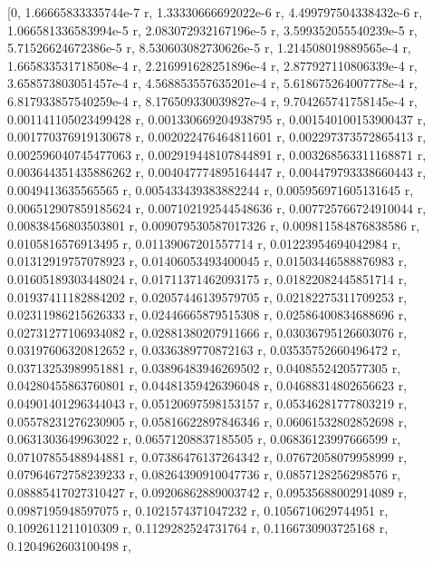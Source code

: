 \documentclass[12pt,arial,letterpaper]{book}
\begin{document}
\begin{eulernootebook}
\begin{eulercomment}
\begin{eulercomment}
\begin{eulernootebook}
\begin{eulercomment}
\begin{eulercomment}
\begin{eulercomment}
\begin{eulercomment}
\begin{eulercomment}
\begin{eulercomment}
\begin{eulernotebook}
\begin{eulercomment}
\begin{eulercomment}
\begin{eulercomment}
\begin{eulercomment}
\begin{eulercomment}
\begin{eulercomment}
\begin{eulercomment}
\begin{eulercomment}
\begin{eulercomment}
\begin{eulercomment}
\begin{eulercomment}
\begin{eulercomment}
\begin{eulercomment}
\begin{eulercomment}
\begin{eulercomment}
\begin{eulercomment}
\begin{euleroutput}
          [0, 1.66665833335744e-7 r, 1.33330666692022e-6 r, 
  4.499797504338432e-6 r, 1.066581336583994e-5 r, 
  2.083072932167196e-5 r, 3.599352055540239e-5 r, 
  5.71526624672386e-5 r, 8.530603082730626e-5 r, 
  1.214508019889565e-4 r, 1.665833531718508e-4 r, 
  2.216991628251896e-4 r, 2.877927110806339e-4 r, 
  3.658573803051457e-4 r, 4.568853557635201e-4 r, 
  5.618675264007778e-4 r, 6.817933857540259e-4 r, 
  8.176509330039827e-4 r, 9.704265741758145e-4 r, 
  0.001141105023499428 r, 0.001330669204938795 r, 
  0.001540100153900437 r, 0.001770376919130678 r, 
  0.002022476464811601 r, 0.002297373572865413 r, 
  0.002596040745477063 r, 0.002919448107844891 r, 
  0.003268563311168871 r, 0.003644351435886262 r, 
  0.004047774895164447 r, 0.004479793338660443 r, 0.0049413635565565 r, 
  0.005433439383882244 r, 0.005956971605131645 r, 
  0.006512907859185624 r, 0.007102192544548636 r, 
  0.007725766724910044 r, 0.00838456803503801 r, 
  0.009079530587017326 r, 0.009811584876838586 r, 0.0105816576913495 r, 
  0.01139067201557714 r, 0.01223954694042984 r, 0.01312919757078923 r, 
  0.01406053493400045 r, 0.01503446588876983 r, 0.01605189303448024 r, 
  0.01711371462093175 r, 0.01822082445851714 r, 0.01937411182884202 r, 
  0.02057446139579705 r, 0.02182275311709253 r, 0.02311986215626333 r, 
  0.02446665879515308 r, 0.02586400834688696 r, 0.02731277106934082 r, 
  0.02881380207911666 r, 0.03036795126603076 r, 0.03197606320812652 r, 
  0.0336389770872163 r, 0.03535752660496472 r, 0.03713253989951881 r, 
  0.03896483946269502 r, 0.0408552420577305 r, 0.04280455863760801 r, 
  0.04481359426396048 r, 0.04688314802656623 r, 0.04901401296344043 r, 
  0.05120697598153157 r, 0.05346281777803219 r, 0.05578231276230905 r, 
  0.05816622897846346 r, 0.06061532802852698 r, 0.0631303649963022 r, 
  0.06571208837185505 r, 0.06836123997666599 r, 0.07107855488944881 r, 
  0.07386476137264342 r, 0.07672058079958999 r, 0.07964672758239233 r, 
  0.08264390910047736 r, 0.0857128256298576 r, 0.08885417027310427 r, 
  0.09206862889003742 r, 0.09535688002914089 r, 0.0987195948597075 r, 
  0.1021574371047232 r, 0.1056710629744951 r, 0.1092611211010309 r, 
  0.1129282524731764 r, 0.1166730903725168 r, 0.1204962603100498 r, 

\end{euleroutput}
\end{eulercomment}
\end{eulercomment}
\end{eulercomment}
\end{eulercomment}
\end{eulercomment}
\end{eulercomment}
\end{eulercomment}
\end{eulercomment}
\end{eulercomment}
\end{eulercomment}
\end{eulercomment}
\end{eulercomment}
\end{eulercomment}
\end{eulercomment}
\end{eulercomment}
\end{eulercomment}
\end{eulernotebook}
\end{eulercomment}
\end{eulercomment}
\end{eulercomment}
\end{eulercomment}
\end{eulercomment}
\end{eulercomment}
\end{eulernootebook}
\end{eulercomment}
\end{eulercomment}
\end{eulernootebook}
\end{document}
